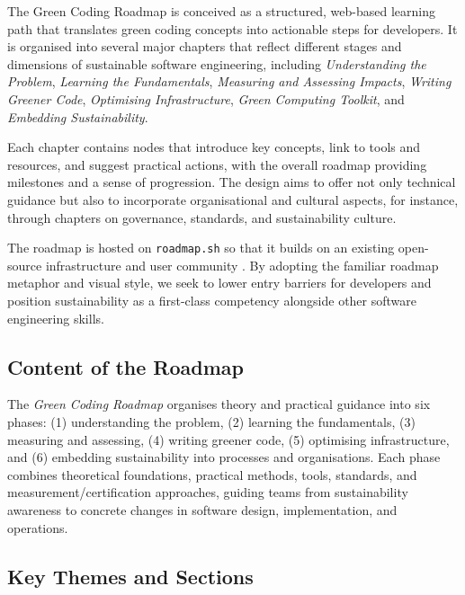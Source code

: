 \documentclass[english]{lni}
\begin{document}
The Green Coding Roadmap is conceived as a structured, web-based learning path that translates green coding concepts into actionable steps for developers. It is organised into several major chapters that reflect different stages and dimensions of sustainable software engineering, including \emph{Understanding the Problem}, \emph{Learning the Fundamentals}, \emph{Measuring and Assessing Impacts}, \emph{Writing Greener Code}, \emph{Optimising Infrastructure}, \emph{Green Computing Toolkit}, and \emph{Embedding Sustainability}.

Each chapter contains nodes that introduce key concepts, link to tools and resources, and suggest practical actions, with the overall roadmap providing milestones and a sense of progression. The design aims to offer not only technical guidance but also to incorporate organisational and cultural aspects, for instance, through chapters on governance, standards, and sustainability culture.

The roadmap is hosted on \texttt{roadmap.sh} so that it builds on an existing open-source infrastructure and user community \cite{junger_2026_workshop}. By adopting the familiar roadmap metaphor and visual style, we seek to lower entry barriers for developers and position sustainability as a first-class competency alongside other software engineering skills.


\subsection{Content of the Roadmap}

The \textit{Green Coding Roadmap} organises theory and practical guidance into six phases: (1) understanding the problem, (2) learning the fundamentals, (3) measuring and assessing, (4) writing greener code, (5) optimising infrastructure, and (6) embedding sustainability into processes and organisations. Each phase combines theoretical foundations, practical methods, tools, standards, and measurement/certification approaches, guiding teams from sustainability awareness to concrete changes in software design, implementation, and operations.


\subsection{Key Themes and Sections}
\end{document}
